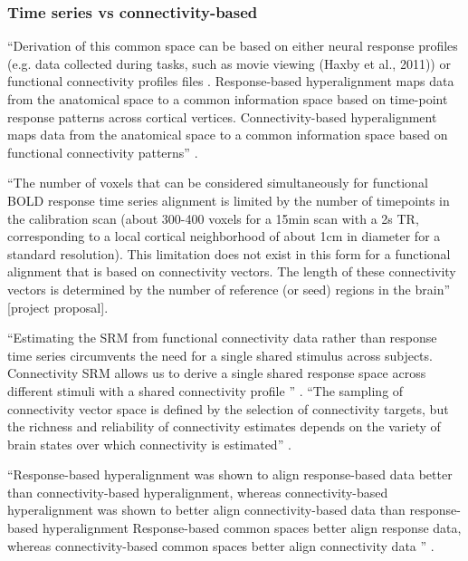 \subsubsection{Time series vs connectivity-based}



%
``Derivation of this common space can be based on either neural response
profiles (e.g. data collected during tasks, such as movie viewing (Haxby et al.,
2011)) or functional connectivity profiles files
\citep{guntupalli2018computational}.
%
Response-based hyperalignment maps data from the anatomical space to a common
information space based on time-point response patterns across cortical
vertices.
%
Connectivity-based hyperalignment maps data from the anatomical space to a
common information space based on functional connectivity patterns''
\citep{busch2021hybrid}.

%
``The number of voxels that can be considered simultaneously for functional BOLD
response time series alignment is limited by the number of timepoints in the
calibration scan (about 300-400 voxels for a 15min scan with a 2s TR,
corresponding to a local cortical neighborhood of about 1cm in diameter for a
standard resolution).
%
This limitation does not exist in this form for a functional alignment that is
based on connectivity vectors.
%
The length of these connectivity vectors is determined by the number of
reference (or seed) regions in the brain'' [project proposal].


``Estimating the SRM from functional connectivity data rather than response time
series circumvents the need for a single shared stimulus across subjects.
%
Connectivity SRM allows us to derive a single shared response space across
different stimuli with a shared connectivity profile
\citep{nastase2019leveraging}'' \citep{kumar2020brainiak}.
%
``The sampling of connectivity vector space is defined by the selection of
connectivity targets, but the richness and reliability of connectivity estimates
depends on the variety of brain states over which connectivity is estimated''
\citep{haxby2020hyperalignment}.


%
``Response-based hyperalignment was shown to align response-based data better
than connectivity-based hyperalignment, whereas connectivity-based
hyperalignment was shown to better align connectivity-based data than
response-based hyperalignment
%
Response-based common spaces better align response data, whereas
connectivity-based common spaces better align connectivity data
\citep{guntupalli2018computational}'' \citep{busch2021hybrid}.


